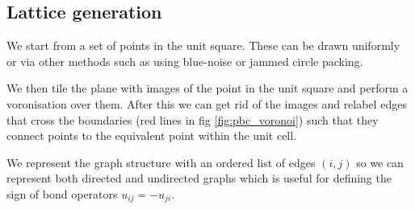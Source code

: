 \subsection{Lattice generation}

We start from a set of points in the unit square. These can be drawn uniformly or via other methods such as using blue-noise or jammed circle packing. 

We then tile the plane with images of the point in the unit square and perform a voronisation over them. After this we can get rid of the images and relabel edges that cross the boundaries (red lines in fig \ref{fig:pbc_voronoi}) such that they connect points to the equivalent point within the unit cell.

We represent the graph structure with an ordered list of edges \((i,j)\) so we can represent both directed and undirected graphs which is useful for defining the sign of bond operators \(u_{ij} = - u_{ji}\).



